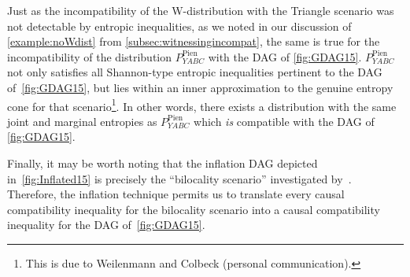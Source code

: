 \documentclass[aps,english,superscriptaddress,onecolumn,twoside,longbibliography,pra,floatfix,fleqn,nofootinbib]{revtex4-1}%
\theoremstyle{definition}
\newcounter{example}[section]
\begin{document}
Just as the incompatibility of the W-distribution with the Triangle scenario was not detectable by entropic inequalities, as we noted in our discussion of \cref{example:noWdist} from \cref{subsec:witnessingincompat}, the same is true for the incompatibility of the distribution $P^{\text{Pien}}_{YABC}$ with the DAG of \cref{fig:GDAG15}. $P^{\text{Pien}}_{YABC}$ not only satisfies all Shannon-type entropic inequalities pertinent to the DAG of~\cref{fig:GDAG15}, but lies within an inner approximation to the genuine entropy cone for that scenario\footnote{This is due to Weilenmann and Colbeck (personal communication).}. In other words, there exists a distribution with the same joint and marginal entropies as  $P^{\text{Pien}}_{YABC}$ which \emph{is} compatible with the DAG of \cref{fig:GDAG15}.


Finally, it may be worth noting that the inflation DAG depicted in~\cref{fig:Inflated15} is precisely the ``bilocality scenario'' investigated by~\citet{BilocalCorrelations}.  Therefore, the inflation technique permits us to translate every causal compatibility inequality for the bilocality scenario into a causal compatibility inequality for the DAG of~\cref{fig:GDAG15}.
\clearpage
\end{document}
